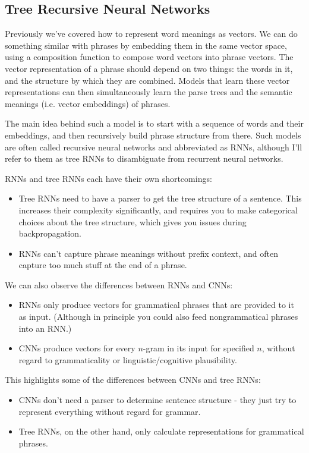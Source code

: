 \subsection{Tree Recursive Neural Networks}
Previously we've covered how to represent word meanings as vectors. We can do something similar with phrases by embedding them in the same vector space, using a composition function to compose word vectors into phrase vectors. The vector representation of a phrase should depend on two things: the words in it, and the structure by which they are combined. Models that learn these vector representations can then simultaneously learn the parse trees and the semantic meanings (i.e. vector embeddings) of phrases.

The main idea behind such a model is to start with a sequence of words and their embeddings, and then recursively build phrase structure from there. Such models are often called recursive neural networks and abbreviated as RNNs, although I'll refer to them as tree RNNs to disambiguate from recurrent neural networks.

RNNs and tree RNNs each have their own shortcomings:
\begin{itemize}
\item Tree RNNs need to have a parser to get the tree structure of a sentence. This increases their complexity significantly, and requires you to make categorical choices about the tree structure, which gives you issues during backpropagation.
\item RNNs can't capture phrase meanings without prefix context, and often capture too much stuff at the end of a phrase.
\end{itemize}
We can also observe the differences between RNNs and CNNs:
\begin{itemize}
\item RNNs only produce vectors for grammatical phrases that are provided to it as input. (Although in principle you could also feed nongrammatical phrases into an RNN.)
\item CNNs produce vectors for every $n$-gram in its input for specified $n$, without regard to grammaticality or linguistic/cognitive plausibility.
\end{itemize}
This highlights some of the differences between CNNs and tree RNNs:
\begin{itemize}
\item CNNs don't need a parser to determine sentence structure - they just try to represent everything without regard for grammar.
\item Tree RNNs, on the other hand, only calculate representations for grammatical phrases.
\end{itemize}

